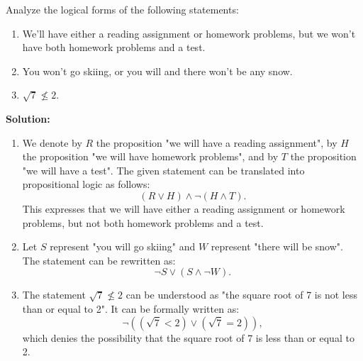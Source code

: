 Analyze the logical forms of the following statements:
\begin{enumerate}[label=(\alph*)]
    \item We'll have either a reading assignment or homework problems, but we won't have both homework problems and a test.
    \item You won't go skiing, or you will and there won't be any snow.
    \item $\sqrt{7} \nleq 2$.
\end{enumerate}

\textbf{Solution:}
\begin{enumerate}[label=(\alph*)]
\item We denote by $R$ the proposition "we will have a reading assignment", by $H$ the proposition "we will have homework problems", and by $T$ the proposition "we will have a test". The given statement can be translated into propositional logic as follows:
$$(R \vee H) \wedge \neg (H \wedge T).$$
This expresses that we will have either a reading assignment or homework problems, but not both homework problems and a test.

\item Let $S$ represent "you will go skiing" and $W$ represent "there will be snow". The statement can be rewritten as:
$$\neg S \vee (S \wedge \neg W).$$

\item The statement $\sqrt{7} \nleq 2$ can be understood as "the square root of 7 is not less than or equal to 2". It can be formally written as:
$$   \neg \left( (\sqrt{7} < 2) \vee (\sqrt{7} = 2) \right),$$
which denies the possibility that the square root of 7 is less than or equal to 2.
\end{enumerate}

\pagebreak